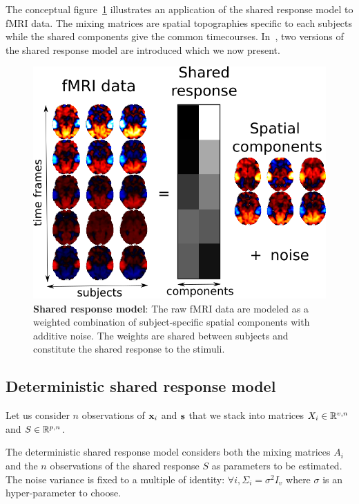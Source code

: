 \documentclass{article}
\begin{document}
The conceptual figure~\ref{fig:srm:conceptual_figure} illustrates an 
application of the shared response model to fMRI data.
%
The mixing
matrices are spatial topographies specific to each subjects while the shared
components give the common timecourses.
%
In~\cite{chen2015reduced, anderson2016enabling}, two versions of the shared
response model are introduced which we now present.
% 


\begin{figure}
  \centering
  \includegraphics[scale=0.3]{figures/srm/conceptual_figure33.png}
  \caption{\textbf{Shared response model}: The raw fMRI data are modeled as a
    weighted combination of subject-specific spatial components with additive
    noise.
    The weights are shared between subjects and constitute the shared response
    to the stimuli.
  }
  \label{fig:srm:conceptual_figure}
\end{figure}


\subsection{Deterministic shared response model}
\label{sec:deterministicsrm}
Let us consider $n$ observations of $\mathbf{x}_i$ and $\mathbf{s}$ that we stack into
matrices $X_i \in \mathbb{R}^{v, n}$ and $S \in \mathbb{R}^{p, n}$.


The deterministic shared response model considers both the mixing matrices $A_i$ and
the $n$ observations of the shared response $S$ as parameters to be
estimated.
%
The noise variance is fixed to a multiple of identity: $\forall i,
\Sigma_i=\sigma^2 I_v$ where $\sigma$ is an hyper-parameter to choose.
\end{document}
